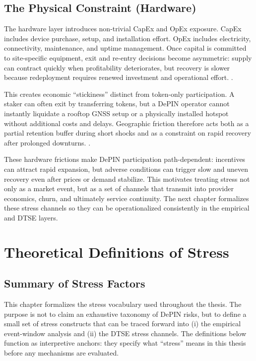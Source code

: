 \subsection{The Physical Constraint (Hardware)}
The hardware layer introduces non-trivial CapEx and OpEx exposure. CapEx includes device purchase, setup, and installation effort. OpEx includes electricity, connectivity, maintenance, and uptime management. Once capital is committed to site-specific equipment, exit and re-entry decisions become asymmetric: supply can contract quickly when profitability deteriorates, but recovery is slower because redeployment requires renewed investment and operational effort.
\cite{Arthur1989, Lin2024}.

This creates economic ``stickiness'' distinct from token-only participation. A staker can often exit by transferring tokens, but a DePIN operator cannot instantly liquidate a rooftop GNSS setup or a physically installed hotspot without additional costs and delays. Geographic friction therefore acts both as a partial retention buffer during short shocks and as a constraint on rapid recovery after prolonged downturns.
\cite{Ballandies2023, Lin2024}.

These hardware frictions make DePIN participation path-dependent: incentives can attract rapid expansion, but adverse conditions can trigger slow and uneven recovery even after prices or demand stabilize. This motivates treating stress not only as a market event, but as a set of channels that transmit into provider economics, churn, and ultimately service continuity. The next chapter formalizes these stress channels so they can be operationalized consistently in the empirical and DTSE layers.

\section{Theoretical Definitions of Stress}
\label{sec:theoretical_definitions}

\subsection{Summary of Stress Factors}
This chapter formalizes the stress vocabulary used throughout the thesis. The purpose is not to claim an exhaustive taxonomy of DePIN risks, but to define a small set of stress constructs that can be traced forward into (i) the empirical event-window analysis and (ii) the DTSE stress channels. The definitions below function as interpretive anchors: they specify what ``stress'' means in this thesis before any mechanisms are evaluated.


